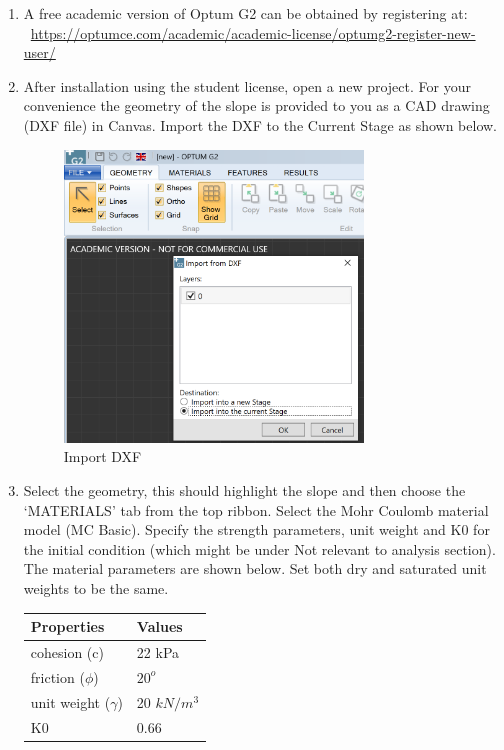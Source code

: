 \documentclass[a4paper,12pt]{article}
\begin{document}
\begin{enumerate}
	\item A free academic version of Optum G2 can be obtained by registering at: ~\url{https://optumce.com/academic/academic-license/optumg2-register-new-user/}
	
	\item After installation using the student license, open a new project. For your convenience the geometry of the slope is provided to you as a CAD drawing (DXF file) in Canvas. Import the DXF to the Current Stage as shown below.
	
	\begin{figure}[!h]
		\centering
		\includegraphics[width=0.75\textwidth]{figs/import-dxf.png}
		\caption{Import DXF}
	\end{figure}
	
	\item Select the geometry, this should highlight the slope and then choose the `MATERIALS' tab from the top ribbon. Select the Mohr Coulomb material model (MC Basic). Specify the strength parameters, unit weight and K0 for the initial condition (which might be under Not relevant to analysis section). The material parameters are shown below. Set both dry and saturated unit weights to be the same.

	\begin{table}[!h]
		\centering
		\begin{tabular}{ll}
			\toprule
			\textbf{Properties}     & \textbf{Values} \\
			\midrule
			cohesion (c) & 22 kPa    \\
			friction ($\phi$)   & $20^o$   \\
			unit weight ($\gamma$)   & 20 $kN/m^3$    \\
			K0             & 0.66  \\
			\bottomrule
		\end{tabular}
	\end{table}
	

\end{enumerate}
\end{document}

